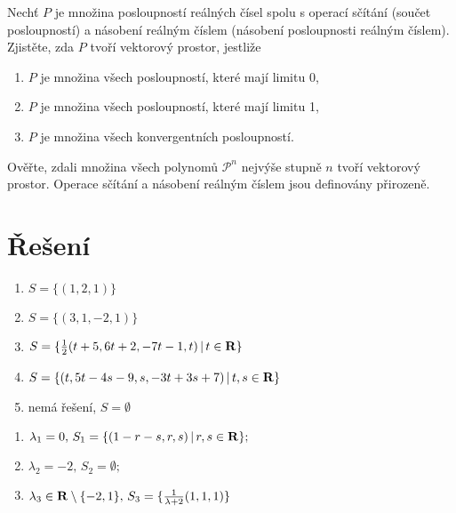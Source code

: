 \documentclass[a4paper,10pt]{book}
\def\Real{{\rm\bf R}}
\def\where{\,|\,}                    %
\begin{document}
\exercise \label{ex:vek7} Nechť $P$ je množina posloupností reálných čísel spolu s operací sčítání (součet
posloupností) a násobení reálným číslem (násobení posloupnosti reálným číslem).
Zjistěte, zda $P$ tvoří vektorový prostor, jestliže
\begin{enumerate}[label=\alph*)]
\item $P$ je množina všech posloupností, které mají limitu 0,
\item $P$ je množina všech posloupností, které mají limitu 1,
\item $P$ je množina všech konvergentních posloupností.
\end{enumerate}

\exercise \label{ex:vek8} Ověřte, zdali množina všech polynomů $\mathcal{P}^{n}$
nejvýše stupně $n$ tvoří vektorový prostor. Operace sčítání a násobení reálným číslem jsou 
definovány přirozeně.



\section{Řešení}

\begin{enumerate}[leftmargin=.75cm,align=left,label={\alph*)},itemsep=-5pt, topsep=-7pt]
    \item $S=\{(1,2,1)\}$
    \item $S=\{(3,1,-2,1)\}$  
    \item $S=\{\frac{1}{2}(t+5,6t+2,-7t-1,t)\where t\in\Real\}$    
    \item $S=\{(t,5t-4s-9,s,-3t+3s+7)\where t,s\in\Real\}$
    \item nemá řešení, $S=\emptyset$
  \end{enumerate}
  
\begin{enumerate}[leftmargin=.75cm,labelsep=0cm,align=left,label={},itemsep=-5pt, topsep=-7pt]
 \item $\lambda_1=0,\, S_1=\{(1-r-s,r,s)\where r,s\in\Real\};\,$
 \item         $\lambda_2=-2,\, S_2=\emptyset; \,$
 \item    $\lambda_3\in\Real\setminus\{-2,1\},\, S_3=\{\frac{1}{\lambda+2}(1,1,1)\}$
\end{enumerate}
\end{document}
